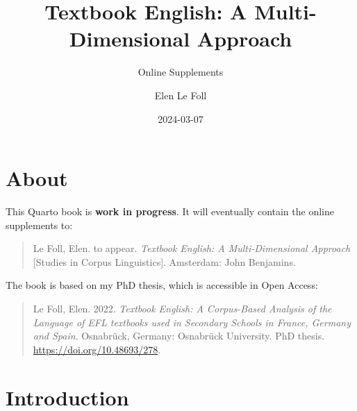 \documentclass[
  letterpaper,
  DIV=11,
  numbers=noendperiod]{scrreprt}
\title{Textbook English: A Multi-Dimensional Approach}
\subtitle{Online Supplements}
\author{Elen Le Foll}
\date{2024-03-07}
\renewcommand*\contentsname{Table of contents}
\newcommand\contentsname{Table of contents}
\begin{document}
\maketitle

\renewcommand*\contentsname{Table of contents}
{
\hypersetup{linkcolor=}
\setcounter{tocdepth}{2}
\tableofcontents
}

\chapter*{About}\label{about}


This Quarto book is \textbf{work in progress}. It will eventually
contain the online supplements to:

\begin{quote}
Le Foll, Elen. to appear. \emph{Textbook English: A Multi-Dimensional
Approach} {[}Studies in Corpus Linguistics{]}. Amsterdam: John
Benjamins.
\end{quote}

The book is based on my PhD thesis, which is accessible in Open Access:

\begin{quote}
Le Foll, Elen. 2022. \emph{Textbook English: A Corpus-Based Analysis of
the Language of EFL textbooks used in Secondary Schools in France,
Germany and Spain}. Osnabrück, Germany: Osnabrück University. PhD
thesis. \url{https://doi.org/10.48693/278}.
\end{quote}


\chapter{Introduction}\label{introduction}
\end{document}
